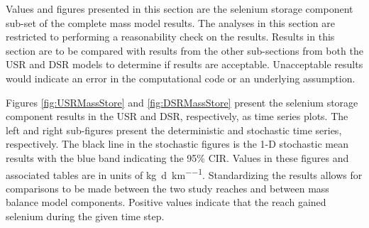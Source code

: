 \begin{linenumbers}
Values and figures presented in this section are the selenium storage component sub-set of the complete mass model results.  The analyses in this section are restricted to performing a reasonability check on the results.  Results in this section are to be compared with results from the other sub-sections from both the USR and DSR models to determine if results are acceptable.  Unacceptable results would indicate an error in the computational code or an underlying assumption.

Figures \ref{fig:USRMassStore} and \ref{fig:DSRMassStore} present the selenium storage component results in the USR and DSR, respectively, as time series plots.  The left and right sub-figures present the deterministic and stochastic time series, respectively.  The black line in the stochastic figures is the 1-D stochastic mean results with the blue band indicating the 95\% CIR.  Values in these figures and associated tables are in units of \si{\kilo\gram\per\day\per\kilo\meter}.  Standardizing the results allows for comparisons to be made between the two study reaches and between mass balance model components.  Positive values indicate that the reach gained selenium during the given time step.


\end{linenumbers}
